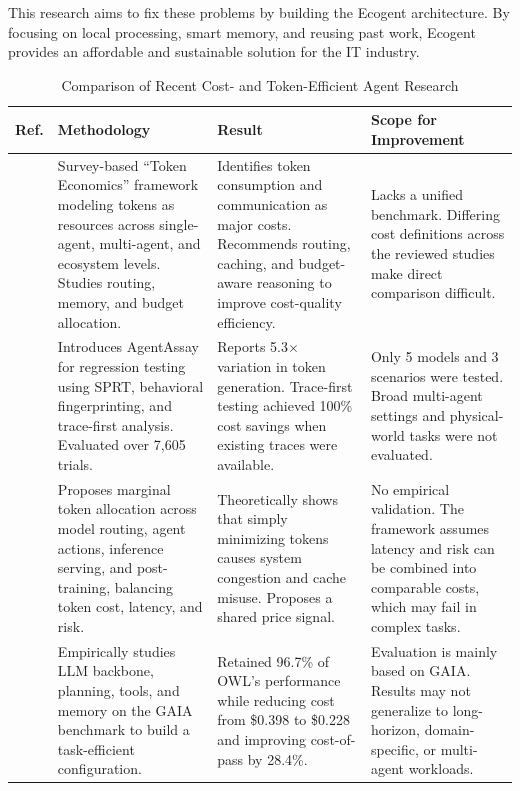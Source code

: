 This research aims to fix these problems by building the Ecogent architecture. By focusing on local processing, smart memory, and reusing past work, Ecogent provides an affordable and sustainable solution for the IT industry.
\begin{table}[htbp]
\centering
\caption{Comparison of Recent Cost- and Token-Efficient Agent Research}
\label{tab:related_work_cost_efficient_agents}
\begin{tabular}{c p{} p{} p{}}
\hline
\textbf{Ref.} & \textbf{Methodology} & \textbf{Result} & \textbf{Scope for Improvement} \\
\hline

\cite{token_economics} &
Survey-based ``Token Economics'' framework modeling tokens as resources across single-agent, multi-agent, and ecosystem levels. Studies routing, memory, and budget allocation.
&
Identifies token consumption and communication as major costs. Recommends routing, caching, and budget-aware reasoning to improve cost-quality efficiency.
&
Lacks a unified benchmark. Differing cost definitions across the reviewed studies make direct comparison difficult.
\\
\hline

\cite{ai_tokenomics}&
Introduces AgentAssay for regression testing using SPRT, behavioral fingerprinting, and trace-first analysis. Evaluated over 7,605 trials.
&
Reports 5.3$\times$ variation in token generation. Trace-first testing achieved 100\% cost savings when existing traces were available.
&
Only 5 models and 3 scenarios were tested. Broad multi-agent settings and physical-world tasks were not evaluated.
\\
\hline

\cite{marginal_token} &
Proposes marginal token allocation across model routing, agent actions, inference serving, and post-training, balancing token cost, latency, and risk.
&
Theoretically shows that simply minimizing tokens causes system congestion and cache misuse. Proposes a shared price signal.
&
No empirical validation. The framework assumes latency and risk can be combined into comparable costs, which may fail in complex tasks.
\\
\hline

\cite{efficient_agents} &
Empirically studies LLM backbone, planning, tools, and memory on the GAIA benchmark to build a task-efficient configuration.
&
Retained 96.7\% of OWL's performance while reducing cost from \$0.398 to \$0.228 and improving cost-of-pass by 28.4\%.
&
Evaluation is mainly based on GAIA. Results may not generalize to long-horizon, domain-specific, or multi-agent workloads.
\\
\hline


\end{tabular}
\end{table}
